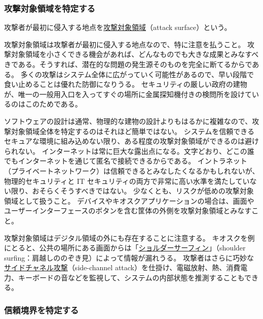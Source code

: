 \documentclass[uplatex]{jsarticle}
\def\label#1{}%
\begin{document}
\subsubsection{攻撃対象領域を特定する}\label{subsec:ch2-identify-attack-surfaces}

\begin{dfn}[攻撃対象領域]\label{dfn:ch2-attack-surface}
攻撃者が最初に侵入する地点を\underline{攻撃対象領域}（attack surface）という。
\end{dfn}

攻撃対象領域は攻撃者が最初に侵入する地点なので、特に注意を払うこと。
攻撃対象領域を小さくできる機会があれば、どんなものでも大きな成果とみなすべきである。そうすれば、潜在的な問題の発生源そのものを完全に断てるからである。
多くの攻撃はシステム全体に広がっていく可能性があるので、早い段階で食い止めることは優れた防御になりうる。
セキュリティの厳しい政府の建物が、唯一の一般用入口を入ってすぐの場所に金属探知機付きの検問所を設けているのはこのためである。

ソフトウェアの設計は通常、物理的な建物の設計よりもはるかに複雑なので、攻撃対象領域全体を特定するのはそれほど簡単ではない。
システムを信頼できるセキュアな環境に組み込めない限り、ある程度の攻撃対象領域ができるのは避けられない。
インターネットは常に巨大な露出点になる。文字どおり、どこの誰でもインターネットを通じて匿名で接続できるからである。
イントラネット（プライベートネットワーク）は信頼できるとみなしたくなるかもしれないが、物理的セキュリティと IT セキュリティの両方で非常に高い水準を満たしていない限り、おそらくそうすべきではない。
少なくとも、リスクが低めの攻撃対象領域として扱うこと。
デバイスやキオスクアプリケーションの場合は、画面やユーザーインターフェースのボタンを含む筐体の外側を攻撃対象領域とみなすこと。

\begin{rem}[デジタル領域の外にある攻撃対象領域]\label{rem:ch2-non-digital-attack-surface}
攻撃対象領域はデジタル領域の外にも存在することに注意する。
キオスクを例にとると、公共の場所にある画面からは「\underline{ショルダーサーフィン}」（shoulder surfing：肩越しののぞき見）によって情報が漏れうる。
攻撃者はさらに巧妙な\underline{サイドチャネル攻撃}（side-channel attack）を仕掛け、電磁放射、熱、消費電力、キーボードの音などを監視して、システムの内部状態を推測することもできる。
\end{rem}

\subsubsection{信頼境界を特定する}\label{subsec:ch2-identify-trust-boundaries}
\end{document}
